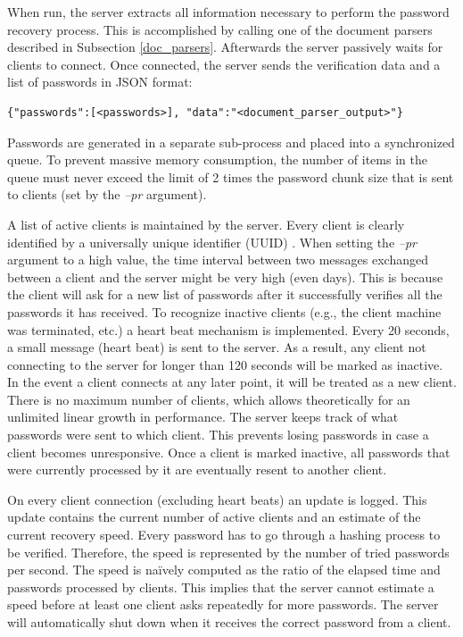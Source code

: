 \documentclass[11pt,oneside]{fithesis2}
\begin{document}
When run, the server extracts all information necessary to perform the password recovery process. This is accomplished by calling one of the document parsers described in Subsection \ref{doc_parsers}. Afterwards the server passively waits for clients to connect. Once connected, the server sends the verification data and a list of passwords in JSON \cite{rfc7159} format:

\begin{lstlisting} 
{"passwords":[<passwords>], "data":"<document_parser_output>"}
\end{lstlisting}\label{server_message}

Passwords are generated in a separate sub-process and placed into a synchronized queue. To prevent massive memory consumption, the number of items in the queue must never exceed the limit of 2 times the password chunk size that is sent to clients (set by the \textit{–pr} argument).

A list of active clients is maintained by the server. Every client is clearly identified by a universally unique identifier (UUID) \cite{rfc4122}. When setting the \textit{–pr} argument to a high value, the time interval between two messages exchanged between a client and the server might be very high (even days). This is because the client will ask for a new list of passwords after it successfully verifies all the passwords it has received. To recognize inactive clients (e.g., the client machine was terminated, etc.) a heart beat mechanism is implemented. Every 20 seconds, a small message (heart beat) is sent to the server. As a result, any client not connecting to the server for longer than 120 seconds will be marked as inactive. In the event a client connects at any later point, it will be treated as a new client. There is no maximum number of clients, which allows theoretically for an unlimited linear growth in performance. The server keeps track of what passwords were sent to which client. This prevents losing passwords in case a client becomes unresponsive. Once a client is marked inactive, all passwords that were currently processed by it are eventually resent to another client. 

On every client connection (excluding heart beats) an update is logged. This update contains the current number of active clients and an estimate of the current recovery speed. Every password has to go through a hashing process to be verified. Therefore, the speed is represented by the number of tried passwords per second. The speed is naïvely computed as the ratio of the elapsed time and passwords processed by clients. This implies that the server cannot estimate a speed before at least one client asks repeatedly for more passwords. The server will automatically shut down when it receives the correct password from a client.
\end{document}
